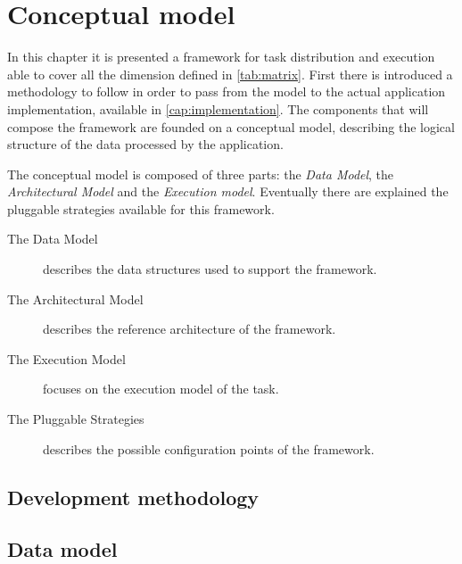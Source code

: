 \chapter{Conceptual model}
\label{cap:model}



In this chapter it is presented a framework for task distribution and execution
able to cover all the dimension defined in \autoref{tab:matrix}.
First there is introduced a methodology to follow in order to pass from the model to the
actual application implementation, available in \autoref{cap:implementation}.
The components that will compose the framework are founded on a conceptual model,
describing the logical structure of the data processed by the application.

The conceptual model is composed of three parts: the \emph{Data Model}, the
\emph{Architectural Model} and the \emph{Execution model}. Eventually there are
explained the pluggable strategies available for this framework.
\begin{description}
    \item[The Data Model] describes the data structures
    used to support the framework.
    \item[The Architectural Model] describes
    the reference architecture of the framework.
    \item[The Execution Model] focuses on the
    execution model of the task.
    \item[The Pluggable Strategies] describes
    the possible configuration points of the framework.
\end{description}

\section{Development methodology}
\label{sec:model:method}


\section{Data model}
\label{sec:model:data}



